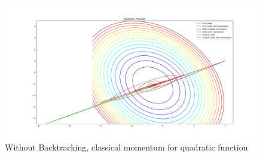 \documentclass{article}
\begin{document}
\begin{center}
\begin{figure}[H]
	\includegraphics[width=\linewidth]{../Images/quadraticmomentum.png}
	\caption{Without Backtracking, classical momentum for quadratic function}
	\label{fig:Without Backtracking, classical momentum for quadratic function}
\end{figure}


\end{center}
\end{document}
